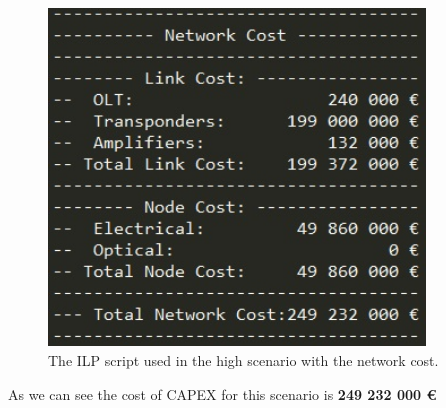 \begin{figure}[h!]
\centering
\includegraphics[width=10cm]{sdf/ilp/figures/script_opaque_protec_ref_high}
\caption{The ILP script used in the high scenario with the network cost.}
\label{scriptopaque_surv_ref_high}
\end{figure}

As we can see the cost of CAPEX for this scenario is \textbf{249 232 000 \euro}\\


